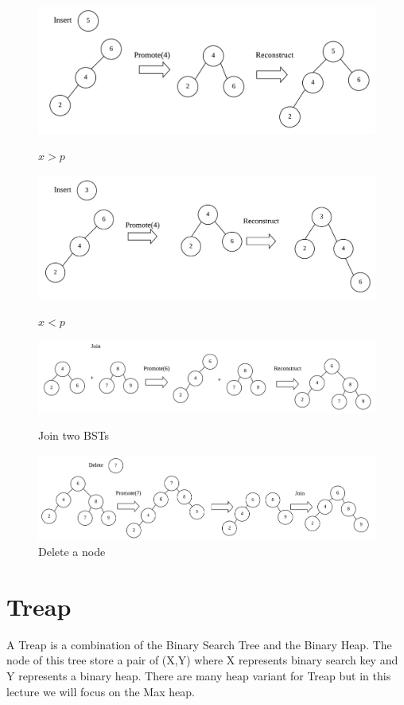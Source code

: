 \documentclass[12pt]{article}
\begin{document}
\begin{figure}
  \centering
  \includegraphics[scale=0.5]{img00.png}
  \caption{$x > p$}
  \includegraphics[scale=0.5]{img01.png}
  \caption{$x < p$}
  \includegraphics[scale=0.5]{img02.png}
  \caption{Join two BSTs}
  \includegraphics[scale=0.5]{img03.png}
  \caption{Delete a node}
\end{figure}

\newpage
\section{Treap}
A Treap is a combination of the Binary Search Tree and the Binary Heap. The node of this tree store a pair of (X,Y) where X represents binary search key and Y represents a binary heap. There are many heap variant for Treap but in this lecture we will focus on the Max heap.
\end{document}
